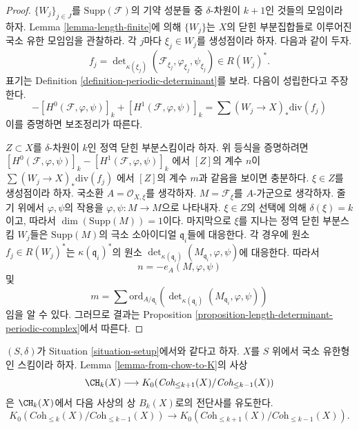 \begin{proof}
$\{W_j\}_{j \in J}$를 $\text{Supp}(\mathcal{F})$의 기약 성분들 중
$\delta$-차원이 $k + 1$인 것들의 모임이라 하자.
Lemma \ref{lemma-length-finite}에 의해 $\{W_j\}$는 $X$의 닫힌
부분집합들로 이루어진 국소 유한 모임임을 관찰하라. 각 $j$마다
$\xi_j \in W_j$를 생성점이라 하자. 다음과 같이 두자.
$$
f_j = \det\nolimits_{\kappa(\xi_j)}
(\mathcal{F}_{\xi_j}, \varphi_{\xi_j}, \psi_{\xi_j})
\in
R(W_j)^*.
$$
표기는 Definition \ref{definition-periodic-determinant}를 보라.
다음이 성립한다고 주장한다.
$$
- [H^0(\mathcal{F}, \varphi, \psi)]_k + [H^1(\mathcal{F}, \varphi, \psi)]_k
=
\sum (W_j \to X)_*\text{div}(f_j)
$$
이를 증명하면 보조정리가 따른다.

\medskip\noindent
$Z \subset X$를 $\delta$-차원이 $k$인 정역 닫힌 부분스킴이라 하자.
위 등식을 증명하려면
$
[H^0(\mathcal{F}, \varphi, \psi)]_k - [H^1(\mathcal{F}, \varphi, \psi)]_k
$
에서 $[Z]$의 계수 $n$이
$
\sum (W_j \to X)_*\text{div}(f_j)
$
에서 $[Z]$의 계수 $m$과 같음을 보이면 충분하다.
$\xi \in Z$를 생성점이라 하자. 국소환 $A = \mathcal{O}_{X, \xi}$를
생각하자. $M = \mathcal{F}_\xi$를 $A$-가군으로 생각하자.
줄기 위에서 $\varphi, \psi$의 작용을
$\varphi, \psi : M \to M$으로 나타내자. $\xi \in Z$의 선택에 의해
$\delta(\xi) = k$이고, 따라서 $\dim(\text{Supp}(M)) = 1$이다.
마지막으로 $\xi$를 지나는 정역 닫힌 부분스킴 $W_j$들은
$\text{Supp}(M)$의 극소 소아이디얼 $\mathfrak q_i$들에 대응한다.
각 경우에 원소 $f_j \in R(W_j)^*$는
$\kappa(\mathfrak q_i)^*$의 원소
$\det_{\kappa(\mathfrak q_i)}(M_{\mathfrak q_i}, \varphi, \psi)$에
대응한다. 따라서
$$
n = - e_A(M, \varphi, \psi)
$$
및
$$
m =
\sum
\text{ord}_{A/\mathfrak q_i}
(\det\nolimits_{\kappa(\mathfrak q_i)}(M_{\mathfrak q_i}, \varphi, \psi))
$$
임을 알 수 있다. 그러므로 결과는 Proposition
\ref{proposition-length-determinant-periodic-complex}에서 따른다.
\end{proof}

\begin{lemma}
\label{lemma-cycles-rational-equivalence-K-group}
$(S, \delta)$가 Situation \ref{situation-setup}에서와 같다고 하자.
$X$를 $S$ 위에서 국소 유한형인 스킴이라 하자. Lemma
\ref{lemma-from-chow-to-K}의 사상
$$
\CH_k(X) \longrightarrow
K_0(\textit{Coh}_{\leq k + 1}(X)/\textit{Coh}_{\leq k - 1}(X))
$$
은 $\CH_k(X)$에서 다음 사상의 상 $B_k(X)$로의 전단사를 유도한다.
$$
K_0(\textit{Coh}_{\leq k}(X)/\textit{Coh}_{\leq k - 1}(X))
\longrightarrow
K_0(\textit{Coh}_{\leq k + 1}(X)/\textit{Coh}_{\leq k - 1}(X)).
$$
\end{lemma}

